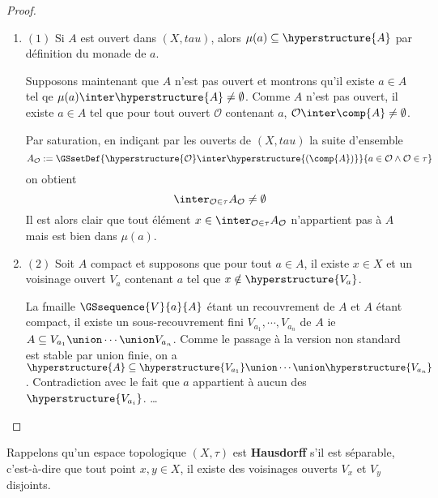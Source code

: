 \documentclass[a4paper, 12pt]{report}
\begin{document}
\ifdefined\outputproof
\begin{proof}
	\begin{enumerate}
		\item $(1)$ Si $A$ est ouvert dans $(X, tau)$, alors $\mu(a) \subseteq
			\hyperstructure{A}$ par définition du monade de $a$.

			Supposons maintenant que $A$ n'est pas ouvert et montrons qu'il
			existe $a \in A$ tel qe $\mu(a) \inter \hyperstructure{A} \neq
			\emptyset$. Comme $A$ n'est pas ouvert, il existe $a \in A$ tel que
			pour tout ouvert $\mathcal{O}$ contenant $a$, $\mathcal{O} \inter
			\comp{A} \neq \emptyset$.

			Par saturation, en indiçant par les ouverts de $(X, tau)$ la suite
			d'ensemble
			\begin{equation}
				A_{\mathcal{O}} := \GSsetDef{\hyperstructure{\mathcal{O}} \inter
				\hyperstructure{(\comp{A})}}{a \in \mathcal{O} \wedge
				\mathcal{O} \in \tau}
			\end{equation}
			on obtient
			\begin{equation}
				\inter_{\mathcal{O} \in \tau} A_{\mathcal{O}} \neq \emptyset
			\end{equation}
			Il est alors clair que tout élément $x \in \inter_{\mathcal{O} \in
		\tau} A_{\mathcal{O}}$ n'appartient pas à $A$ mais est bien dans $\mu(a)$.

		\item $(2)$ Soit $A$ compact et supposons que pour tout $a \in A$, il
			existe $x \in X$ et un voisinage ouvert $V_{a}$ contenant $a$ tel
			que $x \notin \hyperstructure{V_{a}}$.

			La fmaille $\GSsequence{V}{a}{A}$ étant un recouvrement de $A$ et
			$A$ étant compact, il existe un sous-recouvrement fini $V_{a_{1}},
			\cdots, V_{a_{n}}$ de $A$ ie $A \subseteq V_{a_{1}} \union \cdots
			\union V_{a_{n}}$. Comme le passage à la version non standard est
			stable par union finie, on a $\hyperstructure{A} \subseteq
			\hyperstructure{V_{a_{1}}} \union \cdots \union
			\hyperstructure{V_{a_{n}}}$. Contradiction avec le fait que $a$
			appartient à aucun des $\hyperstructure{V_{a_{i}}}$.
			\ldots
	\end{enumerate}
\end{proof}
\fi

Rappelons qu'un espace topologique $(X, \tau)$ est \textbf{Hausdorff} s'il est
séparable, c'est-à-dire que tout point $x, y \in X$, il existe des voisinages
ouverts $V_{x}$ et $V_{y}$ disjoints.
\end{document}
